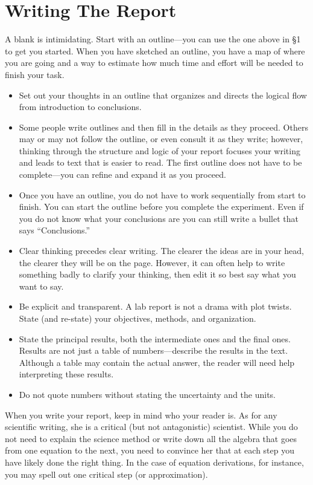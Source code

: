 \documentclass[12pt,preprint]{aastex}
\begin{document}
\section{Writing The Report}

\noindent
A blank is intimidating. Start with an outline---you can use the one above in \S1 to get you started. When you have sketched an outline, you have a map of where you are going and a way to estimate how much time and effort will be needed to finish your task.
\begin{itemize}
\item Set out your thoughts in an outline that organizes and directs the logical flow from introduction to conclusions. 
\item Some people write outlines and then fill in the details as they proceed. Others may or may not follow the outline, or even consult it as they write; however, thinking through the structure and logic of your report focuses your writing and leads to text that is easier to read. The first outline does not have to be complete---you can refine and expand it as you proceed. 
\item Once you have an outline, you do not have to work sequentially from start to finish. You can start the outline before you complete the experiment. Even if you do not know what your conclusions are you can still write a bullet that says ``Conclusions.”
\item Clear thinking precedes clear writing. The clearer the ideas are in your head, the clearer they will be on the page. However, it can often help to write something badly to clarify your thinking, then edit it so best say what you want to say.
\item Be explicit and transparent. A lab report is not a drama with plot twists. State (and re-state) your objectives, methods, and organization. 
\item State the principal results, both the intermediate ones and the final ones. Results are not just a table of numbers---describe the results in the text. Although a table may contain the actual answer, the reader will need help interpreting these results. 
\item Do not quote numbers without stating the uncertainty and the units.

\end{itemize}

\noindent
When you write your report, keep in mind who your reader is. As for any scientific writing, she is a critical (but not antagonistic) scientist. While you do not need to explain the science method or write down all the algebra that goes from one equation to the next, you need to convince her that at each step you have likely done the right thing. In the case of equation derivations, for instance, you may spell out one critical step (or approximation).
\end{document}
